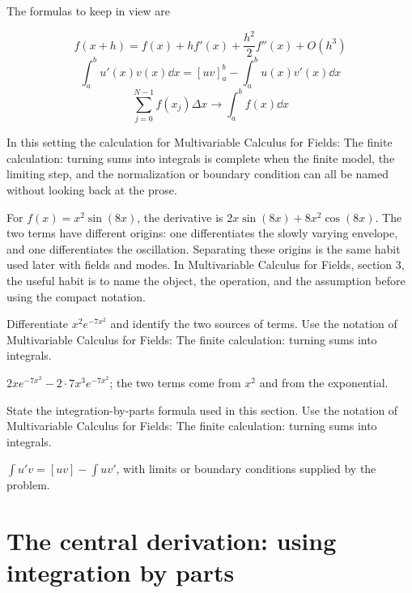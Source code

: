 The formulas to keep in view are

\[
  f(x+h)=f(x)+hf'(x)+\frac{h^2}{2}f''(x)+O(h^3)
\]
\[
  \int_a^b u'(x)v(x)\dd x=[uv]_a^b-\int_a^b u(x)v'(x)\dd x
\]
\[
  \sum_{j=0}^{N-1}f(x_j)\Delta x\longrightarrow \int_a^b f(x)\dd x
\]

In this setting the calculation for Multivariable Calculus for Fields: The finite calculation: turning sums into integrals is complete when the finite model, the limiting step, and the normalization or boundary condition can all be named without looking back at the prose.




\begin{example}
For \(f(x)=x^2\sin(8x)\), the derivative is \(2x\sin(8x)+8x^2\cos(8x)\).  The two terms have different origins: one differentiates the slowly varying envelope, and one differentiates the oscillation.  Separating these origins is the same habit used later with fields and modes.  In Multivariable Calculus for Fields, section 3, the useful habit is to name the object, the operation, and the assumption before using the compact notation.
\end{example}



\begin{exercise}
Differentiate \(x^2e^{-7x^2}\) and identify the two sources of terms.  Use the notation of Multivariable Calculus for Fields: The finite calculation: turning sums into integrals.
\begin{answer}
\(2xe^{-7x^2}-2\cdot 7x^3e^{-7x^2}\); the two terms come from \(x^2\) and from the exponential.
\end{answer}
\end{exercise}

\begin{exercise}
State the integration-by-parts formula used in this section.  Use the notation of Multivariable Calculus for Fields: The finite calculation: turning sums into integrals.
\begin{answer}
\(\int u'v=[uv]-\int uv'\), with limits or boundary conditions supplied by the problem.
\end{answer}
\end{exercise}



\section{The central derivation: using integration by parts}

